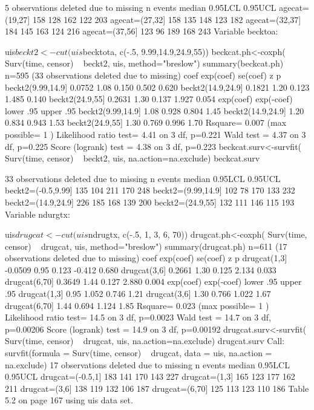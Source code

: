    5 observations deleted due to missing 
                 n events median 0.95LCL 0.95UCL
agecat=(19,27] 158    128    162     122     203
agecat=(27,32] 158    135    148     123     182
agecat=(32,37] 184    145    163     124     216
agecat=(37,56] 123     96    189     168     243
Variable becktoa:

uis$beckt2<-cut(uis$becktota, c(-.5, 9.99,14.9,24.9,55))
beckcat.ph<-coxph( Surv(time, censor) ~ beckt2, uis, method="breslow")
summary(beckcat.ph)
  n=595 (33 observations deleted due to missing)
                    coef exp(coef) se(coef)     z     p
beckt2(9.99,14.9] 0.0752      1.08    0.150 0.502 0.620
beckt2(14.9,24.9] 0.1821      1.20    0.123 1.485 0.140
beckt2(24.9,55]   0.2631      1.30    0.137 1.927 0.054
                  exp(coef) exp(-coef) lower .95 upper .95
beckt2(9.99,14.9]      1.08      0.928     0.804      1.45
beckt2(14.9,24.9]      1.20      0.834     0.943      1.53
beckt2(24.9,55]        1.30      0.769     0.996      1.70
Rsquare= 0.007   (max possible= 1 )
Likelihood ratio test= 4.41  on 3 df,   p=0.221
Wald test            = 4.37  on 3 df,   p=0.225
Score (logrank) test = 4.38  on 3 df,   p=0.223
beckcat.surv<-survfit( Surv(time, censor) ~ beckt2, uis, na.action=na.exclude)
beckcat.surv

   33 observations deleted due to missing 
                     n events median 0.95LCL 0.95UCL
beckt2=(-0.5,9.99] 135    104    211     170     248
beckt2=(9.99,14.9] 102     78    170     133     232
beckt2=(14.9,24.9] 226    185    168     139     200
beckt2=(24.9,55]   132    111    146     115     193
Variable ndurgtx:

uis$drugcat<-cut(uis$ndrugtx, c(-.5, 1, 3, 6, 70))
drugcat.ph<-coxph( Surv(time, censor) ~ drugcat, uis, method="breslow")
summary(drugcat.ph)
 n=611 (17 observations deleted due to missing)
                 coef exp(coef) se(coef)      z     p
drugcat(1,3]  -0.0509      0.95    0.123 -0.412 0.680
drugcat(3,6]   0.2661      1.30    0.125  2.134 0.033
drugcat(6,70]  0.3649      1.44    0.127  2.880 0.004
              exp(coef) exp(-coef) lower .95 upper .95
drugcat(1,3]       0.95      1.052     0.746      1.21
drugcat(3,6]       1.30      0.766     1.022      1.67
drugcat(6,70]      1.44      0.694     1.124      1.85
Rsquare= 0.023   (max possible= 1 )
Likelihood ratio test= 14.5  on 3 df,   p=0.0023
Wald test            = 14.7  on 3 df,   p=0.00206
Score (logrank) test = 14.9  on 3 df,   p=0.00192
drugcat.surv<-survfit( Surv(time, censor) ~ drugcat, uis, na.action=na.exclude)
drugcat.surv
Call: survfit(formula = Surv(time, censor) ~ drugcat, data = uis, na.action = na.exclude)
   17 observations deleted due to missing 
                   n events median 0.95LCL 0.95UCL
drugcat=(-0.5,1] 183    141    170     143     227
drugcat=(1,3]    165    123    177     162     211
drugcat=(3,6]    138    119    132     106     187
drugcat=(6,70]   125    113    123     110     186
Table 5.2 on page 167 using uis data set.


